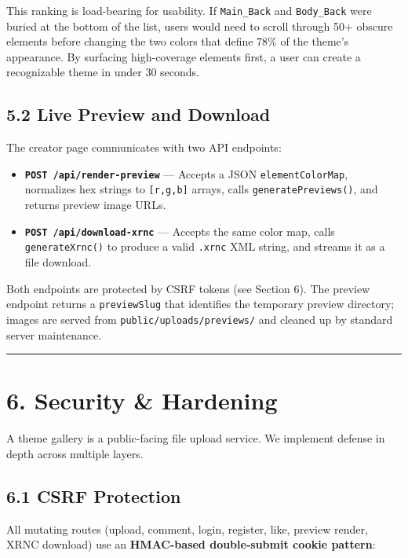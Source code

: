 \documentclass[
  11pt,
  oneside]{report}
\providecommand{\tightlist}{%
  \setlength{\itemsep}{0pt}\setlength{\parskip}{0pt}}
\begin{document}
This ranking is load-bearing for usability. If \texttt{Main\_Back} and
\texttt{Body\_Back} were buried at the bottom of the list, users would
need to scroll through 50+ obscure elements before changing the two
colors that define 78\% of the theme's appearance. By surfacing
high-coverage elements first, a user can create a recognizable theme in
under 30 seconds.

\subsection{5.2 Live Preview and
Download}\label{live-preview-and-download}

The creator page communicates with two API endpoints:

\begin{itemize}
\tightlist
\item
  \textbf{\texttt{POST\ /api/render-preview}} --- Accepts a JSON
  \texttt{elementColorMap}, normalizes hex strings to
  \texttt{{[}r,g,b{]}} arrays, calls \texttt{generatePreviews()}, and
  returns preview image URLs.
\item
  \textbf{\texttt{POST\ /api/download-xrnc}} --- Accepts the same color
  map, calls \texttt{generateXrnc()} to produce a valid \texttt{.xrnc}
  XML string, and streams it as a file download.
\end{itemize}

Both endpoints are protected by CSRF tokens (see Section 6). The preview
endpoint returns a \texttt{previewSlug} that identifies the temporary
preview directory; images are served from
\texttt{public/uploads/previews/} and cleaned up by standard server
maintenance.

\begin{center}\rule{0.5\linewidth}{0.5pt}\end{center}

\section{6. Security \& Hardening}\label{security-hardening}

A theme gallery is a public-facing file upload service. We implement
defense in depth across multiple layers.

\subsection{6.1 CSRF Protection}\label{csrf-protection}

All mutating routes (upload, comment, login, register, like, preview
render, XRNC download) use an \textbf{HMAC-based double-submit cookie
pattern}:
\end{document}
